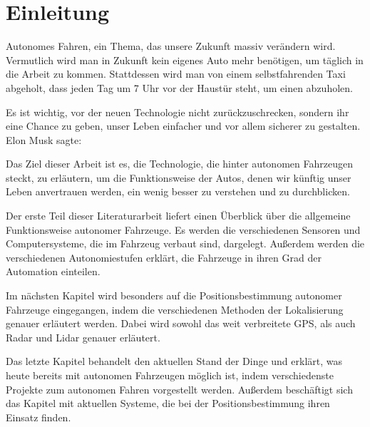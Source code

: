 \chapter{Einleitung}

Autonomes Fahren, ein Thema, das unsere Zukunft massiv verändern wird. Vermutlich wird man in Zukunft kein eigenes Auto mehr benötigen, um täglich in die Arbeit zu kommen. Stattdessen wird man von einem selbstfahrenden Taxi abgeholt, dass jeden Tag um 7 Uhr vor der Haustür steht, um einen abzuholen.

Es ist wichtig, vor der neuen Technologie nicht zurückzuschrecken, sondern ihr eine Chance zu geben, unser Leben einfacher und vor allem sicherer zu gestalten. Elon Musk sagte: 

\bigskip

Das Ziel dieser Arbeit ist es, die Technologie, die hinter autonomen Fahrzeugen steckt, zu erläutern, um die Funktionsweise der Autos, denen wir künftig unser Leben anvertrauen werden, ein wenig besser zu verstehen und zu durchblicken.

Der erste Teil dieser Literaturarbeit liefert einen Überblick über die allgemeine Funktionsweise autonomer Fahrzeuge. Es werden die verschiedenen Sensoren und Computersysteme, die im Fahrzeug verbaut sind, dargelegt. Außerdem werden die verschiedenen Autonomiestufen erklärt, die Fahrzeuge in ihren Grad der Automation einteilen.

Im nächsten Kapitel wird besonders auf die Positionsbestimmung autonomer Fahrzeuge eingegangen, indem die verschiedenen Methoden der Lokalisierung genauer erläutert werden. Dabei wird sowohl das weit verbreitete \ac{GPS}, als auch \acs{Radar} und \acs{Lidar} genauer erläutert.

Das letzte Kapitel behandelt den aktuellen Stand der Dinge und erklärt, was heute bereits mit autonomen Fahrzeugen möglich ist, indem verschiedenste Projekte zum autonomen Fahren vorgestellt werden. Außerdem beschäftigt sich das Kapitel mit aktuellen Systeme, die bei der Positionsbestimmung ihren Einsatz finden.
